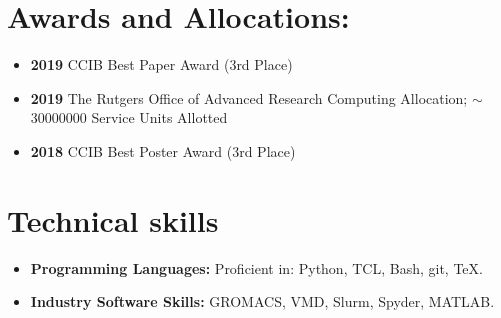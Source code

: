 \section*{Awards and Allocations:}
\begin{itemize}
	\item \textbf{2019} CCIB Best Paper Award (3rd Place)
	\item \textbf{2019} The Rutgers Office of Advanced Research Computing Allocation; $\sim$30000000 Service Units Allotted 
	\item \textbf{2018} CCIB Best Poster Award (3rd Place)
\end{itemize}

\vspace{4pt}
\section*{Technical skills}

\vspace{4pt}

\begin{itemize}

\item \textbf{Programming Languages:} Proficient in: Python, TCL, Bash, git, TeX.
	\vspace{3pt}
    \item \textbf{Industry Software Skills:} GROMACS, VMD, Slurm, Spyder, MATLAB.
    \vspace{3pt}       

\end{itemize}





